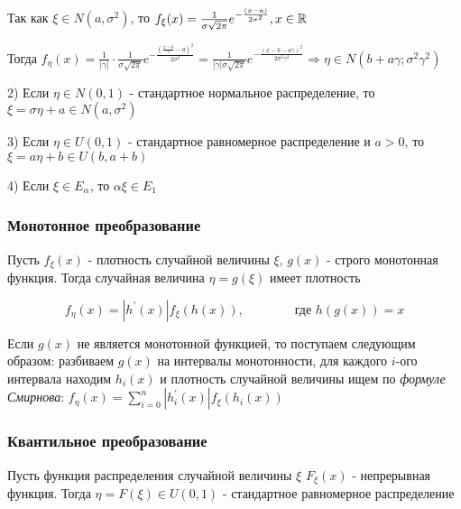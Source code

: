 \documentclass[12pt]{article}
\begin{document}
    \begin{MyProof}
        Так как $\xi \in N(a, \sigma^2)$, то $f_\xi(x) = \frac{1}{\sigma\sqrt{2\pi}} e^{-\frac{(x - a)}{2\sigma^2}}, x \in \mathbb{R}$

        Тогда $f_\eta(x) = \frac{1}{|\gamma|} \cdot \frac{1}{\sigma\sqrt{2\pi}} e^{-\frac{(\frac{x - b}{\gamma} - a)^2}{2\sigma^2}} = \frac{1}{|\gamma|\sigma\sqrt{2\pi}} e^{-\frac{(x - b - a\gamma)^2}{2\sigma^2\gamma^2}} \Longrightarrow \eta \in N(b + a\gamma; \sigma^2\gamma^2)$
    \end{MyProof}

    2) Если $\eta \in N(0, 1)$ - стандартное нормальное распределение, то $\xi = \sigma \eta + a \in N(a, \sigma^2)$

    3) Если $\eta \in U(0, 1)$ - стандартное равномерное распределение и $a > 0$, то $\xi = a\eta + b \in U(b, a + b)$

    4) Если $\xi \in E_\alpha$, то $\alpha \xi \in E_1$

    \subsubsection{Монотонное преобразование}

    \hypertarget{monotonoustransformationtheorem}{}

    \begin{MyTheorem}
        \Ths Пусть $f_\xi(x)$ - плотность случайной величины $\xi$, $g(x)$ - строго монотонная функция. Тогда 
        случайная величина $\eta = g(\xi)$ имеет плотность

        \[f_\eta(x) = |h^\prime(x)| f_\xi(h(x)), \qquad\qquad \text{где } h(g(x)) = x\]
    \end{MyTheorem}

    Если $g(x)$ не является монотонной функцией, то поступаем следующим образом: разбиваем $g(x)$ на интервалы монотонности, 
    для каждого $i$-ого интервала находим $h_i(x)$ и плотность случайной величины ищем по \textit{формуле Смирнова}: 
    $f_\eta(x) = \sum_{i = 0}^n |h_i^\prime(x)| f_\xi(h_i(x))$
    
    \hypertarget{quantiletransformation}{}

    \subsubsection{Квантильное преобразование}

    \begin{MyTheorem}
         Пусть функция распределения случайной величины $\xi$ $F_\xi(x)$ - непрерывная функция. 
        Тогда $\eta = F(\xi) \in U(0, 1)$ - стандартное равномерное распределение
    \end{MyTheorem}
\end{document}
